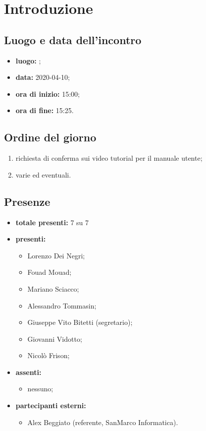 \section*{Introduzione}

\subsection*{Luogo e data dell'incontro}
	\begin{itemize}
		\item \textbf{luogo:} ;
		\item \textbf{data:} 2020-04-10;
		\item \textbf{ora di inizio:} 15:00;
		\item \textbf{ora di fine:} 15:25.
	\end{itemize}

\subsection*{Ordine del giorno}
	\begin{enumerate}
		\item richiesta di conferma sui video tutorial per il manuale utente;
  		\item varie ed eventuali.
	\end{enumerate}

\subsection*{Presenze}
	\begin{itemize}
		\item \textbf{totale presenti:} 7 su 7
		\item \textbf{presenti: }
			\begin{itemize}
				\item Lorenzo Dei Negri;
				\item Fouad Mouad;
				\item Mariano Sciacco;
				\item Alessandro Tommasin;
				\item Giuseppe Vito Bitetti (segretario);
				\item Giovanni Vidotto;
				\item Nicolò Frison;
			\end{itemize}
		\item \textbf{assenti: }
			\begin{itemize}
				\item nessuno;
			\end{itemize}
		\item  \textbf{partecipanti esterni:}
			\begin{itemize}
				\item Alex Beggiato (referente, SanMarco Informatica).
			\end{itemize}
	\end{itemize}


